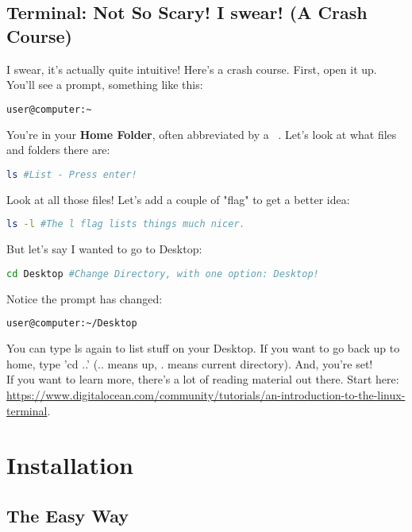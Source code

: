 \documentclass[a4paper,12pt]{article}
\begin{document}
	\subsection{Terminal: Not So Scary! I swear! (A Crash Course)}
		I swear, it's actually quite intuitive! Here's a crash course. First, open it up. You'll see a prompt, something like this:
		
\begin{lstlisting}[language=bash]
	user@computer:~
\end{lstlisting}

		You're in your \textbf{Home Folder}, often abbreviated by a ~. Let's look at what files and folders there are:
	
\begin{lstlisting}[language=bash]
	ls #List - Press enter!
\end{lstlisting}

		Look at all those files! Let's add a couple of "flag" to get a better idea:
		
\begin{lstlisting}[language=bash]
	ls -l #The l flag lists things much nicer.
\end{lstlisting}
		
		But let's say I wanted to go to Desktop:
		
\begin{lstlisting}[language=bash]
	cd Desktop #Change Directory, with one option: Desktop!
\end{lstlisting}

		Notice the prompt has changed:
	
\begin{lstlisting}[language=bash]
	user@computer:~/Desktop
\end{lstlisting}
		
		You can type ls again to list stuff on your Desktop. If you want to go back up to home, type 'cd ..' (.. means up, . means current directory). And, you're set!\\
		
		If you want to learn more, there's a lot of reading material out there. Start here: \url{https://www.digitalocean.com/community/tutorials/an-introduction-to-the-linux-terminal}.

\section{Installation}
	\subsection{The Easy Way}
	
\end{document}
